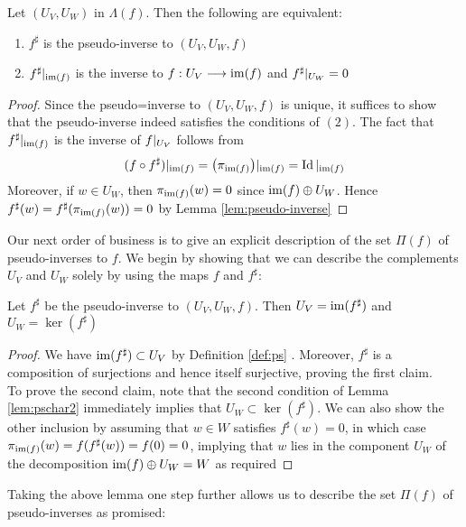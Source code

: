 \begin{lemma}\label{lem:pschar2}
Let $(U_V,U_W)$ in $\Lambda(f)$. Then the following are equivalent:
\begin{enumerate}
	\item $f^\sharp$ is the pseudo-inverse to $(U_V,U_W,f)$
	\item $f^\sharp\arrowvert_{\operatorname{im}(f)}$ is the inverse to $f:U_V\longrightarrow \operatorname{im}(f)$ and $f^\sharp\arrowvert_{U_W}=0$
\end{enumerate}

\end{lemma}

\begin{proof}
	Since the pseudo=inverse to $(U_V,U_W,f)$ is unique, it suffices to show that the pseudo-inverse indeed satisfies the conditions of $(2)$. The fact that $f^\sharp\arrowvert_{\operatorname{im}(f)}$ is the inverse of $f\arrowvert_{U_V}$ follows from 
	\[
	(f\circ f^\sharp) \arrowvert_{\operatorname{im}(f)}=\big(\pi_{\operatorname{im}(f)}\big)\arrowvert_{\operatorname{im}(f)}=\operatorname{Id}\arrowvert_{\operatorname{im}(f)}
\] 
Moreover, if $w \in U_W$, then $\pi_{\operatorname{im}(f)}(w)=0$ since $\operatorname{im}(f)\oplus U_W$. Hence $f^\sharp(w)=f^\sharp(\pi_{\operatorname{im}(f)}(w))=0$ by Lemma \ref{lem:pseudo-inverse}
\end{proof}
Our next order of business is to give an explicit description of the set $\Pi(f)$ of pseudo-inverses to $f$. We begin by showing that we can describe the complements $U_V$ and $U_W$ solely by using the maps $f$ and $f^\sharp$:
\begin{lemma}\label{lem:psim-ker}
	Let $f^\sharp$ be the pseudo-inverse to $(U_V,U_W,f)$. Then $U_V=\operatorname{im}(f^\sharp)$ and $U_W=\ker(f^\sharp)$
\end{lemma}

\begin{proof}
	We have $\operatorname{im}(f^\sharp)\subset U_V$ by Definition \ref{def:ps} . Moreover, $f^\sharp$ is a composition of surjections and hence itself surjective, proving the first claim.\\
	To prove the second claim, note that the second condition of Lemma \ref{lem:pschar2} immediately implies that $U_W\subset \ker(f^\sharp)$. We can also show the other inclusion by assuming that $w\in W$ satisfies $f^\sharp(w)=0$, in which case $\pi_{\operatorname{im}(f)}(w)=f(f^\sharp(w))=f(0)=0$, implying that $w$ lies in the component $U_W$ of the decomposition $\operatorname{im}(f)\oplus U_W=W$ as required
\end{proof}

Taking the above lemma one step further allows us to describe the set $\Pi(f)$ of pseudo-inverses as promised:

